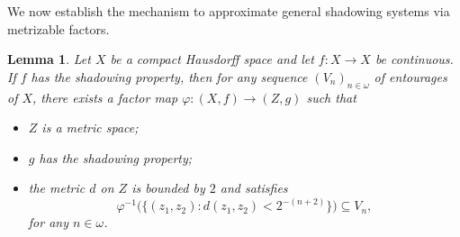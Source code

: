 \documentclass[10pt,a4paper]{amsart}
\newtheorem{lemma}[theorem]{Lemma}
\numberwithin{equation}{section}
\begin{document}
We now establish the mechanism to approximate general shadowing systems via metrizable factors. 

\begin{lemma}\label{keylemma}
Let $X$ be a compact Hausdorff space and let $f: X\to X$ be continuous. 
If $f$ has the shadowing property, then for any sequence $(V_n)_{n\in \omega}$ of entourages of $X$, 
there exists a factor map $\varphi:(X,f)\to (Z,g)$ such that 
\begin{itemize}
\item[(1)] $Z$ is a metric space;
\item[(2)] $g$ has the shadowing property;
\item[(3)] the metric $d$ on $Z$ is bounded by $2$ and satisfies
\begin{equation}\label{eq:factor-control}
\varphi^{-1}\bigl(\{(z_1,z_2): d(z_1,z_2)<{2^{-(n+2)}}\}\bigr)
\subseteq  V_n,
\end{equation}
for any $n\in \omega$.
\end{itemize}
\end{lemma}
\end{document}
